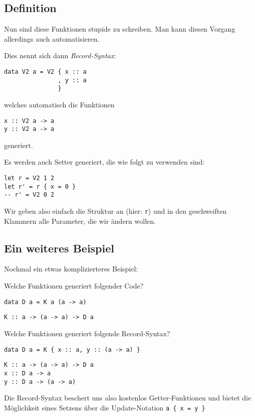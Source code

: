 \documentclass{beamer}
\begin{document}
\subsection{Definition}

\begin{frame}[fragile]
Nun sind diese Funktionen stupide zu schreiben. Man kann diesen Vorgang allerdings auch automatisieren.\\\par
\pause
Dies nennt sich dann \emph{Record-Syntax}:\smallskip

\pause
\begin{verbatim}
data V2 a = V2 { x :: a
               , y :: a
               }
\end{verbatim}
\pause
welches automatisch die Funktionen
\begin{verbatim}
x :: V2 a -> a
y :: V2 a -> a
\end{verbatim}
generiert.
\end{frame}

\begin{frame}[fragile]
Es werden auch Setter generiert, die wie folgt zu verwenden sind: \bigskip
\pause
\begin{verbatim}
let r = V2 1 2
let r' = r { x = 0 }
-- r' = V2 0 2
\end{verbatim}
\pause
\bigskip

Wir geben also einfach die Struktur an (hier: \texttt{r}) und in den geschweiften Klammern alle Parameter, die wir ändern wollen.
\end{frame}

\subsection{Ein weiteres Beispiel}

\begin{frame}[fragile]
Nochmal ein etwas komplizierteres Beispiel:\\\par
\pause
Welche Funktionen generiert folgender Code? \smallskip

\begin{verbatim}
data D a = K a (a -> a)
\end{verbatim}
\pause
\begin{verbatim}
K :: a -> (a -> a) -> D a
\end{verbatim}
\pause
Welche Funktionen generiert folgende Record-Syntax?
\begin{verbatim}
data D a = K { x :: a, y :: (a -> a) }
\end{verbatim}
\pause
\begin{verbatim}
K :: a -> (a -> a) -> D a
x :: D a -> a
y :: D a -> (a -> a)
\end{verbatim}
\pause
Die Record-Syntax beschert uns also kostenlos Getter-Funktionen und bietet die Möglichkeit eines Setzens über die Update-Notation \texttt{a \{ x = y \}}
\end{frame}
\end{document}
